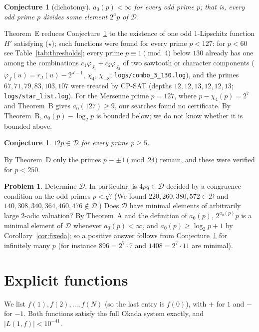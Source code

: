 \documentclass[11pt,a4paper]{article}
\newtheorem{conjecture}[theorem]{Conjecture}
\theoremstyle{definition}
\newtheorem{problem}[theorem]{Problem}
\theoremstyle{remark}
\newcommand{\cD}{\mathcal{D}}
\begin{document}
\begin{conjecture}[dichotomy]\label{conj:dichotomy}
$a_0(p)<\infty$ for every odd prime $p$; that is, every odd prime $p$ divides some element $2^ap$ of $\cD$.
\end{conjecture}

Theorem~E reduces Conjecture~\ref{conj:dichotomy} to the existence of one odd $1$-Lipschitz function $H'$ satisfying ($\star$); such functions were found for every prime $p<127$: for $p<60$ see Table~\ref{tab:thresholds}; every prime $p\equiv1\pmod 4$ below $130$ already has one among the combinations $c_1\varphi_{J_1}+c_2\varphi_{J_2}$ of two sawtooth or character components ($\varphi_J(u)=r_J(u)-2^{J-1}$, $\chi_4$, $\chi_{-8}$; \texttt{logs/combo\_3\_130.log}), and the primes $67,71,79,83,103,107$ were treated by CP-SAT (depths $12,12,13,12,12,13$; \texttt{logs/star\_list.log}). For the Mersenne prime $p=127$, where $p-\chi_4(p)=2^7$ and Theorem~B gives $a_0(127)\ge9$, our searches found no certificate. By Theorem~B, $a_0(p)-\log_2p$ is bounded below; we do not know whether it is bounded above.

\begin{conjecture}\label{conj:12p}
$12p\in\cD$ for every prime $p\ge5$.
\end{conjecture}

By Theorem~D only the primes $p\equiv\pm1\pmod{24}$ remain, and these were verified for $p<250$.

\begin{problem}
Determine $\cD$. In particular: is $4pq\in\cD$ decided by a congruence condition on the odd primes $p<q$? (We found $220,260,380,572\in\cD$ and $140,308,340,364,460,476\notin\cD$.) Does $\cD$ have minimal elements of arbitrarily large $2$-adic valuation? By Theorem~A and the definition of $a_0(p)$, $2^{a_0(p)}p$ is a minimal element of $\cD$ whenever $a_0(p)<\infty$, and $a_0(p)\ge\log_2p+1$ by Corollary~\ref{cor:fixeda}; so a positive answer follows from Conjecture~\ref{conj:dichotomy} for infinitely many $p$ (for instance $896=2^7\cdot7$ and $1408=2^7\cdot11$ are minimal).
\end{problem}

\appendix
\section{Explicit functions}\label{app:examples}
We list $f(1),f(2),\dots,f(N)$ (so the last entry is $f(0)$), with $+$ for $1$ and $-$ for $-1$. Both functions satisfy the full Okada system exactly, and $|L(1,f)|<10^{-41}$.
\end{document}
